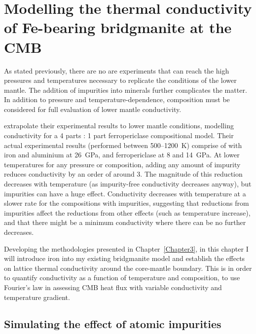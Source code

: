 \chapter{Modelling the thermal conductivity of Fe-bearing bridgmanite at the CMB} %

\label{Chapter4} %

As stated previously, there are no are experiments that can reach the high pressures and temperatures necessary to replicate the conditions of the lower mantle. The addition of impurities into minerals further complicates the matter. In addition to pressure and temperature-dependence, composition must be considered for full evaluation of lower mantle conductivity.

\citet{Manthilake2011} extrapolate their experimental results to lower mantle conditions, modelling conductivity for a 4 parts \bdgs : 1 part ferropericlase compositional model. Their actual experimental results (performed between 500--1200~K) comprise of \bdgs with iron and aluminium at 26~GPa, and ferropericlase at 8 and 14~GPa. At lower temperatures for any pressure or composition, adding any amount of impurity reduces conductivity by an order of around 3. The magnitude of this reduction decreases with temperature (as impurity-free conductivity decreases anyway), but impurities can have a huge effect. Conductivity decreases with temperature at a slower rate for the compositions with impurities, suggesting that reductions from impurities affect the reductions from other effects (such as temperature increase), and that there might be a minimum conductivity where there can be no further decreases.

Developing the methodologies presented in Chapter~\ref{Chapter3}, in this chapter I will introduce iron into my existing bridgmanite model and establish the effects on lattice thermal conductivity around the core-mantle boundary. This is in order to quantify conductivity as a function of temperature and composition, to use Fourier's law in assessing CMB heat flux with variable conductivity and temperature gradient. 



\section{Simulating the effect of atomic impurities}

